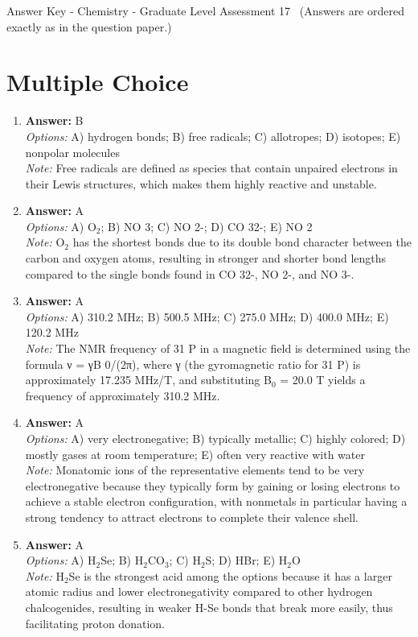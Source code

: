 \documentclass[12pt]{article}
\begin{document}
\begin{center}
Answer Key - Chemistry - Graduate Level Assessment 17 \
\small (Answers are ordered exactly as in the question paper.)
\end{center}

\section*{Multiple Choice}
\begin{enumerate}[label=\arabic*.]
\item \textbf{Answer:} B
\\ \textit{Options:} A) hydrogen bonds; B) free radicals; C) allotropes; D) isotopes; E) nonpolar molecules
\\ \textit{Note:} Free radicals are defined as species that contain unpaired electrons in their Lewis structures, which makes them highly reactive and unstable.
\item \textbf{Answer:} A
\\ \textit{Options:} A) O$_{2}$; B) NO 3; C) NO 2-; D) CO 32-; E) NO 2
\\ \textit{Note:} O$_{2}$ has the shortest bonds due to its double bond character between the carbon and oxygen atoms, resulting in stronger and shorter bond lengths compared to the single bonds found in CO 32-, NO 2-, and NO 3-.
\item \textbf{Answer:} A
\\ \textit{Options:} A) 310.2 MHz; B) 500.5 MHz; C) 275.0 MHz; D) 400.0 MHz; E) 120.2 MHz
\\ \textit{Note:} The NMR frequency of 31 P in a magnetic field is determined using the formula ν = γB 0/(2π), where γ (the gyromagnetic ratio for 31 P) is approximately 17.235 MHz/T, and substituting B$_{0}$ = 20.0 T yields a frequency of approximately 310.2 MHz.
\item \textbf{Answer:} A
\\ \textit{Options:} A) very electronegative; B) typically metallic; C) highly colored; D) mostly gases at room temperature; E) often very reactive with water
\\ \textit{Note:} Monatomic ions of the representative elements tend to be very electronegative because they typically form by gaining or losing electrons to achieve a stable electron configuration, with nonmetals in particular having a strong tendency to attract electrons to complete their valence shell.
\item \textbf{Answer:} A
\\ \textit{Options:} A) H$_{2}$Se; B) H$_{2}$CO$_{3}$; C) H$_{2}$S; D) HBr; E) H$_{2}$O
\\ \textit{Note:} H$_{2}$Se is the strongest acid among the options because it has a larger atomic radius and lower electronegativity compared to other hydrogen chalcogenides, resulting in weaker H-Se bonds that break more easily, thus facilitating proton donation.
\end{enumerate}
\end{document}

